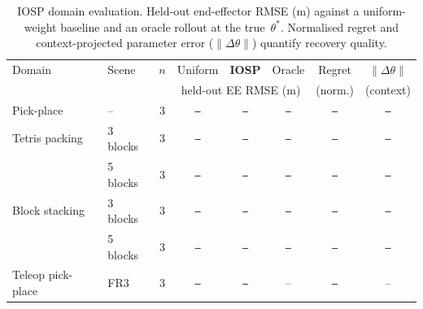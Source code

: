 \begin{table}[t]
\centering
\small
\setlength{\tabcolsep}{4pt}
\caption{IOSP domain evaluation. Held-out end-effector RMSE (m) against a uniform-weight baseline and an oracle rollout at the true~$\theta^*$. Normalised regret and context-projected parameter error ($\|\Delta\theta\|$) quantify recovery quality.}
\label{tab:domains}
\begin{tabular}{llcccccc}
\toprule
Domain & Scene & $n$ & Uniform & \textbf{IOSP} & Oracle & Regret & $\|\Delta\theta\|$ \\
 &  &  & \multicolumn{3}{c}{held-out EE RMSE (m)} & (norm.) & (context) \\
\midrule
Pick-place & -- & 3 & \texttt{--} & \texttt{--} & \texttt{--} & \texttt{--} & \texttt{--} \\
Tetris packing & 3 blocks & 3 & \texttt{--} & \texttt{--} & \texttt{--} & \texttt{--} & \texttt{--} \\
 & 5 blocks & 3 & \texttt{--} & \texttt{--} & \texttt{--} & \texttt{--} & \texttt{--} \\
Block stacking & 3 blocks & 3 & \texttt{--} & \texttt{--} & \texttt{--} & \texttt{--} & \texttt{--} \\
 & 5 blocks & 3 & \texttt{--} & \texttt{--} & \texttt{--} & \texttt{--} & \texttt{--} \\
\midrule
Teleop pick-place & FR3 & 3 & \texttt{--} & \texttt{--} & -- & \texttt{--} & -- \\
\bottomrule
\end{tabular}
\end{table}